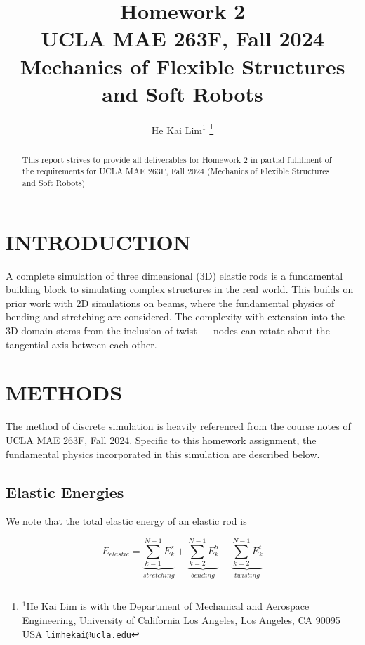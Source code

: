 \documentclass[letterpaper, 10 pt, conference]{ieeeconf}  %
\title{\LARGE \bf
Homework 2 \\
\small{UCLA MAE 263F, Fall 2024\\
Mechanics of Flexible Structures and Soft Robots}%
}
\author{He Kai Lim$^{1}$ %
\thanks{$^{1}$He Kai Lim is with the 
Department of Mechanical and Aerospace Engineering, 
University of California Los Angeles, Los Angeles, CA 90095 USA
        {\tt\small limhekai@ucla.edu}}%
}
\begin{document}
\maketitle
\thispagestyle{empty}
\pagestyle{empty}


\begin{abstract}
   This report strives to provide all deliverables for Homework 2 in partial fulfilment of the requirements for UCLA MAE 263F, Fall 2024 (Mechanics of Flexible Structures and Soft Robots)
\end{abstract}


\section{INTRODUCTION}

A complete simulation of three dimensional (3D) elastic rods is a fundamental building block to simulating complex structures in the real world.
This builds on prior work with 2D simulations on beams, where the fundamental physics of bending and stretching are considered.
The complexity with extension into the 3D domain stems from the inclusion of twist --- nodes can rotate about the tangential axis between each other.


\section{METHODS}

The method of discrete simulation is heavily referenced from the course notes of UCLA MAE 263F, Fall 2024.
Specific to this homework assignment, the fundamental physics incorporated in this simulation are described below.

\subsection{Elastic Energies}

We note that the total elastic energy of an elastic rod is

\begin{equation}
   E_{elastic} = \underbrace{\sum^{N-1}_{k=1}E^s_k}_{stretching} 
   + 
   \underbrace{\sum^{N-1}_{k=2}E^b_k}_{bending} 
   + 
   \underbrace{\sum^{N-1}_{k=2}E^t_k}_{twisting} 
\end{equation}
\end{document}
